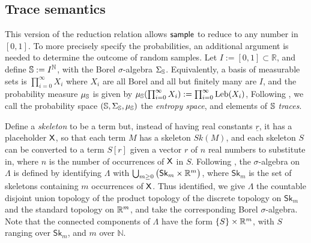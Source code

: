 \subsection{Trace semantics}
\label{sec:sampling semantics}
This version of the reduction relation allows $\mathsf{sample}$ to reduce to any number in $[0,1]$. 
To more precisely specify the probabilities, an additional argument is needed to determine the outcome of random samples. Let $ I := [0,1] \subset \mathbb{R} $, and define ${\mathbb{S}} := I^{\mathbb{N}}$, with the Borel $\sigma$-algebra $\Sigma_{\mathbb{S}}$. Equivalently, a basis of measurable sets is $\prod_{i=0}^\infty X_i$ where $X_i$ are all Borel and all but finitely many are $I$, and the probability measure $\mu_{{\mathbb{S}}}$ is given by $\mu_{{\mathbb{S}}} (\prod_{i=0}^\infty X_i) := \prod_{i=0}^\infty \mathrm{Leb}(X_i)$, 
Following \cite{DBLP:conf/esop/CulpepperC17}, we call the probability space $({\mathbb{S}}, \Sigma_{\mathbb{S}}, \mu_{{\mathbb{S}}})$ the \emph{entropy space}, and elements of ${\mathbb{S}}$ \emph{traces}.

Define a \emph{skeleton} to be a term but, instead of having real constants $\underline r$, it has a placeholder $\mathsf{X}$, so that each term $M$ has a skeleton $\mathit{Sk}(M)$, and each skeleton $S$ can be converted to a term $S[r]$ given a vector $r$ of $n$ real numbers to substitute in, where $n$ is the number of occurrences of $\mathsf{X}$ in $S$. 
Following \cite{DBLP:conf/icfp/BorgstromLGS16,DBLP:conf/lics/StatonYWHK16,DBLP:journals/pacmpl/EhrhardPT18}, the $\sigma$-algebra on $\Lambda$ is defined by identifying $\Lambda$ with $\bigcup_{m\geq 0} \big(\mathsf{Sk}_m \times \mathbb{R}^m \big)$, where $\mathsf{Sk}_m$ is the set of skeletons containing $m$ occurrences of $\mathsf{X}$.
Thus identified, we give $\Lambda$ the countable disjoint union topology of the product topology of the discrete topology on $\mathsf{Sk}_m$ and the standard topology on $\mathbb{R}^m$, and take the corresponding Borel $\sigma$-algebra.
Note that the connected components of $\Lambda$ have the form $\{S\} \times \mathbb{R}^m$, with $S$ ranging over $\mathsf{Sk}_m$, and $m$ over $\mathbb{N}$.

